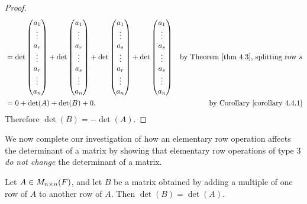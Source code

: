 \begin{proof}
\begin{align*}
      & = \det\begin{pmatrix} a_{1} \\ \vdots \\ a_{r} \\ \vdots \\ a_{r} \\ \vdots \\ a_{n} \end{pmatrix}
        + \det\begin{pmatrix} a_{1} \\ \vdots \\ a_{r} \\ \vdots \\ a_{s} \\ \vdots \\ a_{n} \end{pmatrix}
        + \det\begin{pmatrix} a_{1} \\ \vdots \\ a_{s} \\ \vdots \\ a_{r} \\ \vdots \\ a_{n} \end{pmatrix}
        + \det\begin{pmatrix} a_{1} \\ \vdots \\ a_{s} \\ \vdots \\ a_{s} \\ \vdots \\ a_{n} \end{pmatrix} & \text{by \THM{4.3}, splitting row \(s\)} \\
      & = 0 + \det(A) + \det(B) + 0. & \text{by \CORO{4.4.1}}
\end{align*}
Therefore \(\det(B) = -\det(A)\).
\end{proof}

We now complete our investigation of how an elementary row operation affects the determinant of a matrix by showing that elementary row operations of type 3 \emph{do not change} the determinant of a matrix.

\begin{theorem} \label{thm 4.6}
Let \(A \in M_{n \times n}(F)\), and let \(B\) be a matrix obtained by adding a multiple of one row of \(A\) to another row of \(A\).
Then \(\det(B) = \det(A)\).
\end{theorem}

